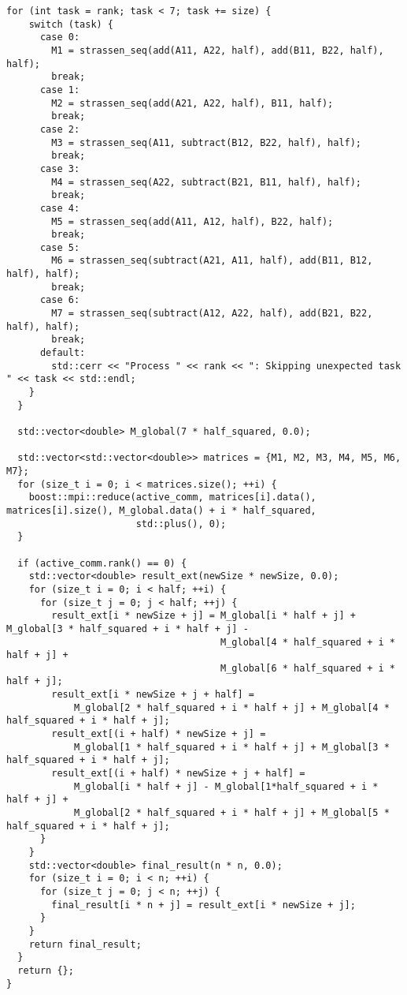 \documentclass[a4paper,12pt]{article}
\begin{document}
\begin{lstlisting}[caption={Функция strassen\_mpi}]
  for (int task = rank; task < 7; task += size) {
    switch (task) {
      case 0:
        M1 = strassen_seq(add(A11, A22, half), add(B11, B22, half), half);
        break;
      case 1:
        M2 = strassen_seq(add(A21, A22, half), B11, half);
        break;
      case 2:
        M3 = strassen_seq(A11, subtract(B12, B22, half), half);
        break;
      case 3:
        M4 = strassen_seq(A22, subtract(B21, B11, half), half);
        break;
      case 4:
        M5 = strassen_seq(add(A11, A12, half), B22, half);
        break;
      case 5:
        M6 = strassen_seq(subtract(A21, A11, half), add(B11, B12, half), half);
        break;
      case 6:
        M7 = strassen_seq(subtract(A12, A22, half), add(B21, B22, half), half);
        break;
      default:
        std::cerr << "Process " << rank << ": Skipping unexpected task " << task << std::endl;
    }
  }

  std::vector<double> M_global(7 * half_squared, 0.0);

  std::vector<std::vector<double>> matrices = {M1, M2, M3, M4, M5, M6, M7};
  for (size_t i = 0; i < matrices.size(); ++i) {
    boost::mpi::reduce(active_comm, matrices[i].data(), matrices[i].size(), M_global.data() + i * half_squared,
                       std::plus(), 0);
  }

  if (active_comm.rank() == 0) {
    std::vector<double> result_ext(newSize * newSize, 0.0);
    for (size_t i = 0; i < half; ++i) {
      for (size_t j = 0; j < half; ++j) {
        result_ext[i * newSize + j] = M_global[i * half + j] + M_global[3 * half_squared + i * half + j] -
                                      M_global[4 * half_squared + i * half + j] +
                                      M_global[6 * half_squared + i * half + j];
        result_ext[i * newSize + j + half] =
            M_global[2 * half_squared + i * half + j] + M_global[4 * half_squared + i * half + j];
        result_ext[(i + half) * newSize + j] =
            M_global[1 * half_squared + i * half + j] + M_global[3 * half_squared + i * half + j];
        result_ext[(i + half) * newSize + j + half] =
            M_global[i * half + j] - M_global[1*half_squared + i * half + j] +
            M_global[2 * half_squared + i * half + j] + M_global[5 * half_squared + i * half + j];
      }
    }
    std::vector<double> final_result(n * n, 0.0);
    for (size_t i = 0; i < n; ++i) {
      for (size_t j = 0; j < n; ++j) {
        final_result[i * n + j] = result_ext[i * newSize + j];
      }
    }
    return final_result;
  }
  return {};
}
\end{lstlisting}
\end{document}
